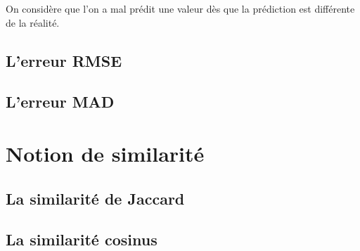 \documentclass[a4paper, 11pt]{article}
\begin{document}
On considère que l'on a mal prédit une valeur dès que la prédiction est différente de la réalité.

\subsection{L'erreur RMSE}

\subsection{L'erreur MAD}

\section{Notion de similarité}

\subsection{La similarité de Jaccard}

\subsection{La similarité cosinus }
\end{document}
